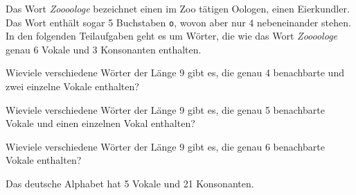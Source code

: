 Das Wort {\em Zoooologe} bezeichnet einen im Zoo tätigen Oologen, einen
Eierkundler. 
Das Wort enthält sogar 5 Buchstaben {\texttt{o}}, wovon aber nur $4$
nebeneinander stehen.
In den folgenden Teilaufgaben geht es um Wörter, die wie das Wort
{\em Zoooologe} genau 6 Vokale und 3 Konsonanten enthalten.
\begin{teilaufgaben}
\item
Wieviele verschiedene Wörter der Länge 9 gibt es, die genau 4 benachbarte
und zwei einzelne Vokale enthalten?
\item
Wieviele verschiedene Wörter der Länge 9 gibt es, die genau
5 benachbarte Vokale und einen einzelnen Vokal enthalten?
\item 
Wieviele verschiedene Wörter der Länge 9 gibt es, die genau 6 benachbarte
Vokale enthalten?
\end{teilaufgaben}

\begin{hinweis}
Das deutsche Alphabet hat 5 Vokale und 21 Konsonanten.
\end{hinweis}

